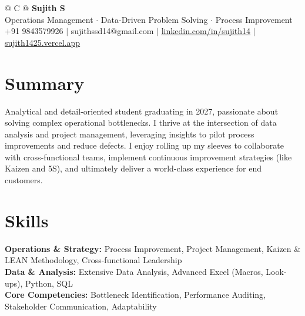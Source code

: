 \documentclass[a4paper,10pt]{article}
\newcommand{\ulink}[2]{\href{#1}{\uline{#2}}}
\begin{document}
\pagestyle{empty}

\begin{tabularx}{\linewidth}{@{} C @{}}
{\color[HTML]{000000}\fontsize{30}{35}\selectfont\bfseries Sujith S} \\[5pt]
{\fontsize{10.5}{12.5}\selectfont\color[HTML]{3A3A3A}
Operations Management $\cdot$ Data-Driven Problem Solving $\cdot$ Process Improvement} \\[6pt]
{\fontsize{9.5}{11.5}\selectfont\textcolor[HTML]{3A3A3A}{+91 9843579926 $|$ sujithssd14@gmail.com $|$ \ulink{https://linkedin.com/in/sujith14}{linkedin.com/in/sujith14} $|$ \ulink{https://sujith1425.vercel.app}{sujith1425.vercel.app}}}
\end{tabularx}

\vspace{2pt}

\section{Summary}
\vspace{3pt}
{\color[HTML]{0A0A0A}\fontsize{11}{14}\selectfont
Analytical and detail-oriented student graduating in 2027, passionate about solving complex operational bottlenecks. I thrive at the intersection of data analysis and project management, leveraging insights to pilot process improvements and reduce defects. I enjoy rolling up my sleeves to collaborate with cross-functional teams, implement continuous improvement strategies (like Kaizen and 5S), and ultimately deliver a world-class experience for end customers.}

\vspace{2pt}

\section{Skills}
\vspace{3pt}
{\color[HTML]{0A0A0A}\fontsize{11}{14}\selectfont
\textbf{Operations \& Strategy:} Process Improvement, Project Management, Kaizen & LEAN Methodology, Cross-functional Leadership \\[2pt]
\textbf{Data \& Analysis:} Extensive Data Analysis, Advanced Excel (Macros, Look-ups), Python, SQL \\[2pt]
\textbf{Core Competencies:} Bottleneck Identification, Performance Auditing, Stakeholder Communication, Adaptability}

\vspace{2pt}
\end{document}
